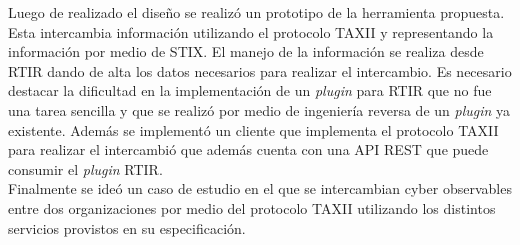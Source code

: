 \bigskip
Luego de realizado el diseño se realizó un prototipo de la herramienta propuesta. Esta intercambia información utilizando el protocolo TAXII y representando la información por medio de STIX. El manejo de la información se realiza desde RTIR dando de alta los datos necesarios para realizar el intercambio. Es necesario destacar la dificultad en la implementación de un \textit{plugin} para RTIR que no fue una tarea sencilla y que se realizó por medio de ingeniería reversa de un \textit{plugin} ya existente. Además se implementó un cliente que implementa el protocolo TAXII para realizar el intercambió que además cuenta con una API REST que puede consumir el \textit{plugin} RTIR.\\
\bigskip
Finalmente se ideó un caso de estudio en el que se intercambian cyber observables entre dos organizaciones por medio del protocolo TAXII utilizando los distintos servicios provistos en su especificación.

